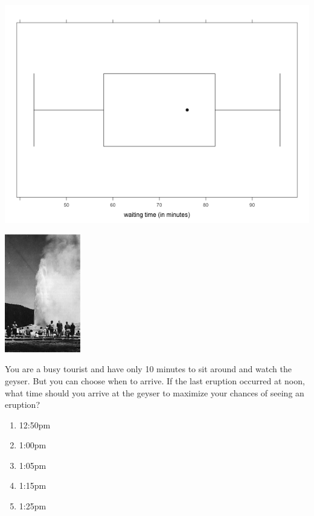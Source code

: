 \begin{marginfigure}
\centering
\includegraphics{includes/faithful1.png}
\end{marginfigure}


\begin{marginfigure}
\centering
\includegraphics[width=1.3in]{includes/old-faithful.jpg}
\end{marginfigure}





\noindent
You are a busy tourist and have only 10 minutes to sit around and
watch the geyser. But you can choose when to arrive. If the last
eruption occurred at noon, what time should you arrive at the geyser
to maximize your chances of seeing an eruption?

\begin{enumerate}[leftmargin=1cm, itemsep=.1em]


\item 12:50pm


\item 1:00pm


\item 1:05pm


\item 1:15pm


\item 1:25pm


\end{enumerate}





